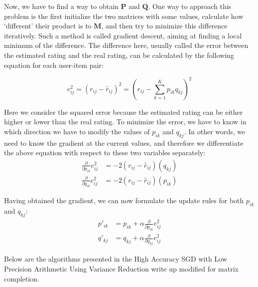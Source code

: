 \documentclass{article}
\begin{document}
Now, we have to find a way to obtain $\mathbf{P}$ and $\mathbf{Q}$. One way to approach this problem is the first initialize the two matrices with some values, calculate how `different’ their product is to $\mathbf{M}$, and then try to minimize this difference iteratively. Such a method is called gradient descent, aiming at finding a local minimum of the difference. The difference here, usually called the error between the estimated rating and the real rating, can be calculated by the following equation for each user-item pair:

\begin{equation}
e_{ij}^2 = (r_{ij} - \hat{r}_{ij})^2 = (r_{ij} - \sum_{k=1}^K{p_{ik}q_{kj}})^2
\end{equation}

Here we consider the squared error because the estimated rating can be either higher or lower than the real rating.
To minimize the error, we have to know in which direction we have to modify the values of  $p_{ik}$ and $q_{kj}$. In other words, we need to know the gradient at the current values, and therefore we differentiate the above equation with respect to these two variables separately:
\begin{align*} 
\frac{\partial}{\partial p_{ik}}e_{ij}^2  &= -2(r_{ij} - \hat{r}_{ij})(q_{kj}) \\
\frac{\partial}{\partial q_{ik}}e_{ij}^2  &= -2(r_{ij} - \hat{r}_{ij})(p_{ik}) 
\end{align*}

Having obtained the gradient, we can now formulate the update rules for both $p_{ik}$ and $q_{kj}$:
\begin{align*}
p'_{ik} &= p_{ik} + \alpha \frac{\partial}{\partial p_{ik}}e_{ij}^2  \\ 
q'_{kj} &=  q_{kj} + \alpha \frac{\partial}{\partial q_{kj}}e_{ij}^2  
\end{align*}

Below are the algorithms presented in the High Accuracy SGD with Low Precision Arithmetic Using Variance Reduction write up modified for matrix completion.  
\end{document}
